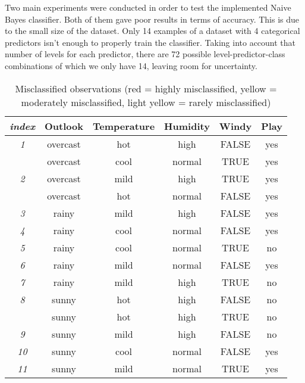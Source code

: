 Two main experiments were conducted in order to test the implemented Naive Bayes classifier. Both of them gave poor results in terms of accuracy. This is due to the small size of the dataset. Only 14 examples of a dataset with 4 categorical predictors isn't enough to properly train the classifier. Taking into account that number of levels for each predictor, there are 72 possible level-predictor-class combinations of which we only have 14, leaving room for uncertainty.

\begin{table}[]
	\renewcommand{\arraystretch}{1.3}
	\caption{Misclassified observations (red = highly misclassified, yellow = moderately misclassified, light yellow = rarely misclassified)}
	\label{tbl:misclassifications}
	\centering
	\begin{tabular}{|>{\em}c|c|c|c|c||c|}
		\hline
		index & Outlook  & Temperature & Humidity & Windy & Play \\ \hline \hline
		\rowcolor{Yellow}
		1 & overcast &  hot        &  high    &  FALSE & yes \\ \hline
		  & overcast &  cool       &  normal  &  TRUE  & yes \\ \hline
		\rowcolor{Yellow}
		2 & overcast &  mild       &  high    &  TRUE  & yes \\ \hline
		  & overcast &  hot        &  normal  &  FALSE & yes \\ \hline
		\rowcolor{lightYellow}
		3 & rainy    &  mild       &  high    &  FALSE & yes \\ \hline
		\rowcolor{Yellow}
		4 & rainy    &  cool       &  normal  &  FALSE & yes \\ \hline
		\rowcolor{Red}
		5 & rainy    &  cool       &  normal  &  TRUE  & no \\ \hline
		\rowcolor{Yellow}
		6 & rainy    &  mild       &  normal  &  FALSE & yes \\ \hline
		\rowcolor{lightYellow}
		7 & rainy    &  mild       &  high    &  TRUE  & no \\ \hline
		\rowcolor{lightYellow}
		8 & sunny    &  hot        &  high    &  FALSE & no \\ \hline
		  & sunny    &  hot        &  high    &  TRUE  & no \\ \hline
		\rowcolor{lightYellow}
		9 & sunny    &  mild       &  high    &  FALSE & no \\ \hline
		\rowcolor{Yellow}
		10& sunny    &  cool       &  normal  &  FALSE & yes \\ \hline
		\rowcolor{Red}
		11& sunny    &  mild       &  normal  &  TRUE  & yes \\ \hline
	\end{tabular}
\end{table}
